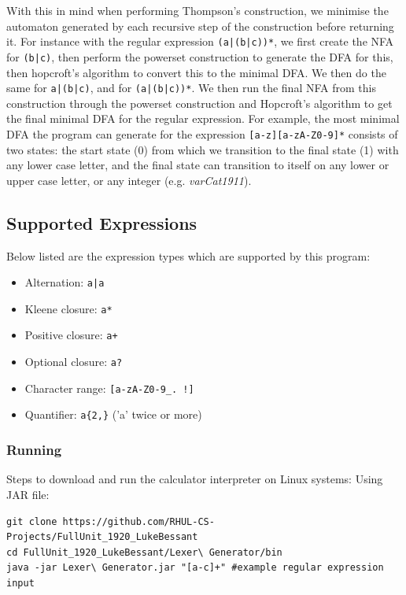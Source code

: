 \documentclass[a4paper, 11pt]{article}
\begin{document}
With this in mind when performing Thompson's construction, we minimise the automaton generated by each recursive step of the construction before returning it. For instance with the regular expression \texttt{(a|(b|c))*}, we first create the NFA for \texttt{(b|c)}, then perform the powerset construction to generate the DFA for this, then hopcroft's algorithm to convert this to the minimal DFA. We then do the same for \texttt{a|(b|c)}, and for \texttt{(a|(b|c))*}. We then run the final NFA from this construction through the powerset construction and Hopcroft's algorithm to get the final minimal DFA for the regular expression. For example, the most minimal DFA the program can generate for the expression \texttt{[a-z][a-zA-Z0-9]*} consists of two states: the start state (0) from which we transition to the final state (1) with any lower case letter, and the final state can transition to itself on any lower or upper case letter, or any integer (e.g. \textit{varCat1911}).

\subsection{Supported Expressions}
Below listed are the expression types which are supported by this program:
\begin{itemize}
\item{Alternation: \texttt{a|a}}
\item{Kleene closure: \texttt{a*}}
\item{Positive closure: \texttt{a+}}
\item{Optional closure: \texttt{a?}}
\item{Character range: \texttt{[a-zA-Z0-9\_.~!]}}
\item{Quantifier: \texttt{a\{2,\}} ('a' twice or more)}
\end{itemize}

\subsubsection{Running}
Steps to download and run the calculator interpreter on Linux systems: Using JAR file:
\begin{verbatim}
git clone https://github.com/RHUL-CS-Projects/FullUnit_1920_LukeBessant
cd FullUnit_1920_LukeBessant/Lexer\ Generator/bin
java -jar Lexer\ Generator.jar "[a-c]+" #example regular expression input
\end{verbatim}
\end{document}
